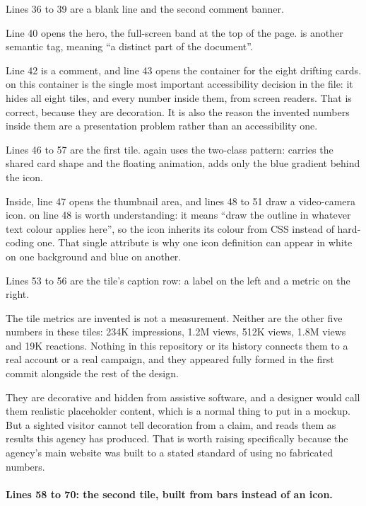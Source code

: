 Lines 36 to 39 are a blank line and the second comment banner.

Line 40 opens the hero, the full-screen band at the top of the page.
 is another semantic tag, meaning ``a distinct part of the
document''.

Line 42 is a comment, and line 43 opens the container for the eight drifting
cards.  on this container is the single most important
accessibility decision in the file: it hides all eight tiles, and every number
inside them, from screen readers. That is correct, because they are decoration.
It is also the reason the invented numbers inside them are a presentation problem
rather than an accessibility one.

Lines 46 to 57 are the first tile.  again uses the
two-class pattern:  carries the shared card shape and the floating
animation,  adds only the blue gradient behind the icon.

Inside, line 47 opens the thumbnail area, and lines 48 to 51 draw a video-camera
icon.  on line 48 is worth understanding: it means
``draw the outline in whatever text colour applies here'', so the icon inherits
its colour from CSS instead of hard-coding one. That single attribute is why one
icon definition can appear in white on one background and blue on another.

Lines 53 to 56 are the tile's caption row: a label on the left and a metric on
the right.

\begin{honest}{The tile metrics are invented}
 is not a measurement. Neither are the other five numbers in
these tiles: 234K impressions, 1.2M views, 512K views, 1.8M views and 19K
reactions. Nothing in this repository or its history connects them to a real
account or a real campaign, and they appeared fully formed in the first commit
alongside the rest of the design.

They are decorative and hidden from assistive software, and a designer would call
them realistic placeholder content, which is a normal thing to put in a mockup.
But a sighted visitor cannot tell decoration from a claim, and reads them as
results this agency has produced. That is worth raising specifically because the
agency's main website was built to a stated standard of using no fabricated
numbers.
\end{honest}

\paragraph{Lines 58 to 70: the second tile, built from bars instead of an icon.}

